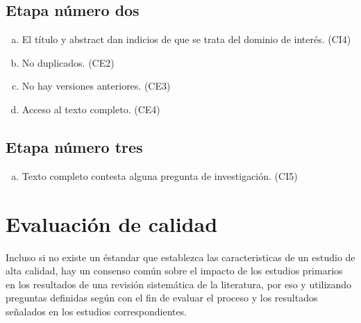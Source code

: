 \documentclass{article}
\begin{document}
\subsection{Etapa número dos}
\begin{enumerate}[(a)]
  \item{El título y abstract dan indicios de que se trata del dominio de interés. (CI4)}
  \item{No duplicados. (CE2)}
  \item{No hay versiones anteriores. (CE3) }
  \item{Acceso al texto completo. (CE4)}
\end{enumerate}

\subsection{Etapa número tres}
\begin{enumerate}[(a)]
  \item{Texto completo contesta alguna pregunta de investigación. (CI5)}
\end{enumerate}
\newpage

\section{Evaluación de calidad}
Incluso si no existe un éstandar que establezca las caracteristicas de un estudio 
de alta calidad, hay un consenso común sobre el impacto de los estudios primarios 
en los resultados de una revisión sistemática de la literatura, por eso y utilizando 
preguntas definidas según \cite{Evidence-Based} con el fin de evaluar el proceso y los
resultados señalados en los estudios correspondientes. 

\begin{center}
\begin{table}[ht]
        \caption{Calidad} 
        \centering 
        \label{table:tablacalidad}
\end{table}
\end{center}
\end{document}
